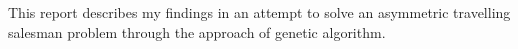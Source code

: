 This report describes my findings in an attempt to solve an
asymmetric travelling salesman problem through the approach
of genetic algorithm.

